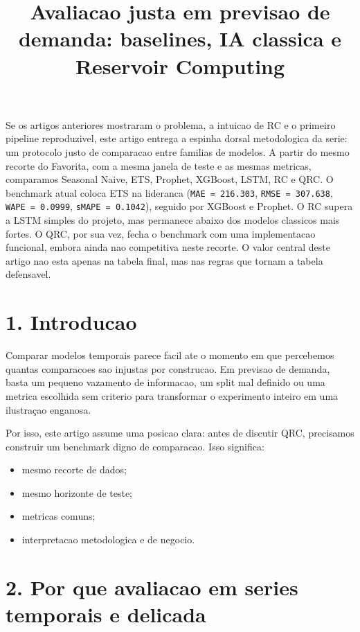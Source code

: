 \documentclass[12pt]{article}
\title{Avaliacao justa em previsao de demanda: baselines, IA classica e Reservoir Computing}
\author{}
\providecommand{\tightlist}{%
  \setlength{\itemsep}{0pt}\setlength{\parskip}{0pt}}
\begin{document}
\maketitle

\begin{resumo}
Se os artigos anteriores mostraram o problema, a intuicao de RC e o primeiro pipeline reproduzivel, este artigo entrega a espinha dorsal metodologica da serie: um protocolo justo de comparacao entre familias de modelos. A partir do mesmo recorte do Favorita, com a mesma janela de teste e as mesmas metricas, comparamos Seasonal Naive, ETS, Prophet, XGBoost, LSTM, RC e QRC. O benchmark atual coloca ETS na lideranca (\texttt{MAE\ =\ 216.303}, \texttt{RMSE\ =\ 307.638}, \texttt{WAPE\ =\ 0.0999}, \texttt{sMAPE\ =\ 0.1042}), seguido por XGBoost e Prophet. O RC supera a LSTM simples do projeto, mas permanece abaixo dos modelos classicos mais fortes. O QRC, por sua vez, fecha o benchmark com uma implementacao funcional, embora ainda nao competitiva neste recorte. O valor central deste artigo nao esta apenas na tabela final, mas nas regras que tornam a tabela defensavel.
\end{resumo}

\section{1. Introducao}\label{1-introducao}

Comparar modelos temporais parece facil ate o momento em que percebemos quantas comparacoes sao injustas por construcao. Em previsao de demanda, basta um pequeno vazamento de informacao, um split mal definido ou uma metrica escolhida sem criterio para transformar o experimento inteiro em uma ilustraçao enganosa.

Por isso, este artigo assume uma posicao clara: antes de discutir QRC, precisamos construir um benchmark digno de comparacao. Isso significa:

\begin{itemize}
\tightlist
\item
  mesmo recorte de dados;
\item
  mesmo horizonte de teste;
\item
  metricas comuns;
\item
  interpretacao metodologica e de negocio.
\end{itemize}

\section{2. Por que avaliacao em series temporais e delicada}\label{2-por-que-avaliacao-em-series-temporais-e-delicada}
\end{document}
